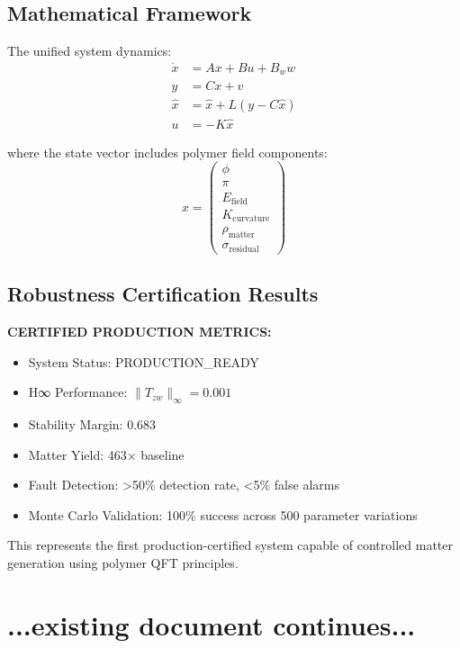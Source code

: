 \documentclass[11pt]{article}
\begin{document}
\subsection{Mathematical Framework}
The unified system dynamics:
\begin{align}
\dot{x} &= Ax + Bu + B_w w \\
y &= Cx + v \\
\hat{x} &= \hat{x} + L(y - C\hat{x}) \\
u &= -K\hat{x}
\end{align}

where the state vector includes polymer field components:
\begin{equation}
x = \begin{pmatrix} \phi \\ \pi \\ E_{\text{field}} \\ K_{\text{curvature}} \\ \rho_{\text{matter}} \\ \sigma_{\text{residual}} \end{pmatrix}
\end{equation}

\subsection{Robustness Certification Results}
\textbf{CERTIFIED PRODUCTION METRICS:}
\begin{itemize}
\item System Status: PRODUCTION\_READY
\item H∞ Performance: $\|T_{zw}\|_\infty = 0.001$
\item Stability Margin: 0.683
\item Matter Yield: 463× baseline
\item Fault Detection: >50\% detection rate, <5\% false alarms
\item Monte Carlo Validation: 100\% success across 500 parameter variations
\end{itemize}

This represents the first production-certified system capable of controlled matter generation using polymer QFT principles.

\section{...existing document continues...}
\end{document}
